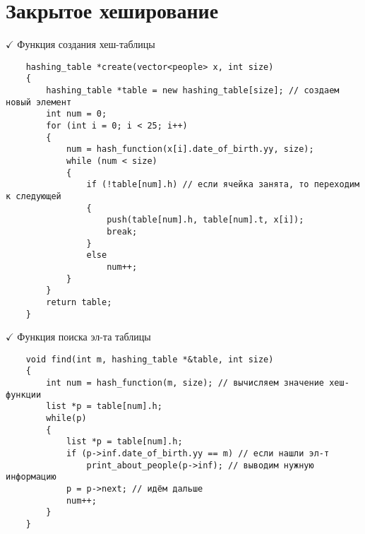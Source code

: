 \documentclass[a4paper, 14pt]{extarticle}
\begin{document}
\section*{Закрытое хеширование}
$\checkmark$ Функция создания хеш-таблицы
\begin{verbatim}
    hashing_table *create(vector<people> x, int size)
    {
        hashing_table *table = new hashing_table[size]; // создаем новый элемент
        int num = 0;
        for (int i = 0; i < 25; i++)
        {
            num = hash_function(x[i].date_of_birth.yy, size); 
            while (num < size)
            {
                if (!table[num].h) // если ячейка занята, то переходим к следующей
                {
                    push(table[num].h, table[num].t, x[i]);
                    break;
                }
                else
                    num++;
            }
        }
        return table;
    }
\end{verbatim}
$\checkmark$ Функция поиска эл-та таблицы
\begin{verbatim}
    void find(int m, hashing_table *&table, int size)
    {
        int num = hash_function(m, size); // вычисляем значение хеш-функции
        list *p = table[num].h;
        while(p)
        {
            list *p = table[num].h;
            if (p->inf.date_of_birth.yy == m) // если нашли эл-т 
                print_about_people(p->inf); // выводим нужную информацию
            p = p->next; // идём дальше
            num++;
        }
    }
\end{verbatim}
\end{document}
